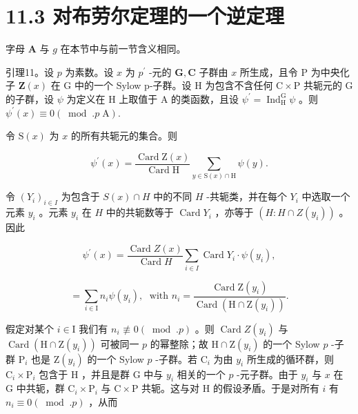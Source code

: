 \documentclass[10pt]{article}
\begin{document}
\section*{11.3 对布劳尔定理的一个逆定理}

字母 \(\mathbf{A}\) 与 \(g\) 在本节中与前一节含义相同。

引理11。设 \(p\) 为素数。设 \(x\) 为 \({p}^{\prime }\) -元的 \(\mathbf{G},\mathbf{C}\) 子群由 \(x\) 所生成，且令 \(\mathrm{P}\) 为中央化子 \(\mathbf{Z}\left( x\right)\) 在 \(\mathrm{G}\) 中的一个 Sylow p-子群。设 \(\mathrm{H}\) 为包含不含任何 \(\mathrm{C} \times  \mathrm{P}\) 共轭元的 \(\mathrm{G}\) 的子群，设 \(\psi\) 为定义在 \(\mathrm{H}\) 上取值于 \(\mathrm{A}\) 的类函数，且设 \({\psi }^{\prime } = {\operatorname{Ind}}_{\mathrm{H}}^{\mathrm{G}}\psi\) 。则 \({\psi }^{\prime }\left( x\right)  \equiv  0\left( {{\;\operatorname{mod}\;.}p\mathrm{\;A}}\right) .\)

令 \(\mathrm{S}\left( x\right)\) 为 \(x\) 的所有共轭元的集合。则

\[
{\psi }^{\prime }\left( x\right)  = \frac{\operatorname{Card}\mathrm{Z}\left( x\right) }{\operatorname{Card}\mathrm{H}}\mathop{\sum }\limits_{{y \in  \mathrm{S}\left( x\right)  \cap  \mathrm{H}}}\psi \left( y\right) .
\]

令 \({\left( {Y}_{i}\right) }_{i \in  I}\) 为包含于 \(S\left( x\right)  \cap  H\) 中的不同 \(H\) -共轭类，并在每个 \({Y}_{i}\) 中选取一个元素 \({y}_{i}\) 。元素 \({y}_{i}\) 在 \(H\) 中的共轭数等于 \(\operatorname{Card}{Y}_{i}\) ，亦等于 \(\left( {H : H \cap  Z\left( {y}_{i}\right) }\right)\) 。因此

\[
{\psi }^{\prime }\left( x\right)  = \frac{\operatorname{Card}Z\left( x\right) }{\operatorname{Card}H}\mathop{\sum }\limits_{{i \in  I}}\operatorname{Card}{Y}_{i} \cdot  \psi \left( {y}_{i}\right) ,
\]

\[
= \mathop{\sum }\limits_{{i \in  \mathrm{I}}}{n}_{i}\psi \left( {y}_{i}\right) ,\;\text{ with }{n}_{i} = \frac{\operatorname{Card}\mathrm{Z}\left( {y}_{i}\right) }{\operatorname{Card}\left( {\mathrm{H} \cap  \mathrm{Z}\left( {y}_{i}\right) }\right) }.
\]

假定对某个 \(i \in  \mathrm{I}\) 我们有 \({n}_{i} \text{ ≢ } 0\left( {\;\operatorname{mod}\;.p}\right)\) 。则 \(\operatorname{Card}Z\left( {y}_{i}\right)\) 与 \(\operatorname{Card}\left( {\mathrm{H} \cap  \mathrm{Z}\left( {y}_{i}\right) }\right)\) 可被同一 \(p\) 的幂整除；故 \(\mathrm{H} \cap  \mathrm{Z}\left( {y}_{i}\right)\) 的一个 Sylow \(p\) -子群 \({\mathrm{P}}_{i}\) 也是 \(\mathrm{Z}\left( {y}_{i}\right)\) 的一个 Sylow \(p\) -子群。若 \({\mathrm{C}}_{i}\) 为由 \({y}_{i}\) 所生成的循环群，则 \({\mathrm{C}}_{i} \times  {\mathrm{P}}_{i}\) 包含于 \(\mathrm{H}\) ，并且是群 G 中与 \({y}_{i}\) 相关的一个 \(p\) -元子群。由于 \({y}_{i}\) 与 \(x\) 在 \(\mathrm{G}\) 中共轭，群 \({\mathrm{C}}_{i} \times  {\mathrm{P}}_{i}\) 与 \(\mathrm{C} \times  \mathrm{P}\) 共轭。这与对 \(\mathrm{H}\) 的假设矛盾。于是对所有 \(i\) 有 \({n}_{i} \equiv  0\left( {\;\operatorname{mod}\;.p}\right)\) ，从而
\end{document}
